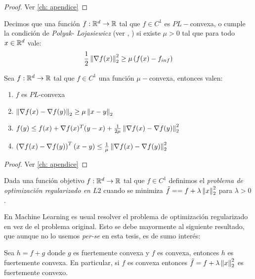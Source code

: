 \begin{proof}
	Ver \ref{ch: apendice}
\end{proof}

\begin{definition}
	\label{def: Condicion PL}
	Decimos que una funci\'on $f:{\mathbb{R}}^d \rightarrow {\mathbb{R}}$ tal que $f \in C^1$ es $PL-$convexa, o cumple la condici\'on de \textit{Polyak- Lojasiewicz} (ver \cite{polyak:1963}, \cite{lojasiewicz:1963}) si existe $\mu >0$ tal que para todo $x \in {\mathbb{R}}^d$ vale:
	\begin{equation}
	\frac{1}{2} \left\lVert\nabla f(x)\right\rVert^2_2 \geq \mu \left(f(x) - f_{inf}\right)
	\end{equation}
\end{definition}

\begin{proposition}
	\label{prop: implicancias de convexidad fuerte}
	Sea $f:{\mathbb{R}}^d \rightarrow {\mathbb{R}}$ tal que $f \in C^1$ una funci\'on $\mu-$convexa, entonces valen:
	\begin{enumerate}
		\item $f$ es $PL$-convexa
		\item $\left\lVert\nabla f(x) - \nabla f(y)\right\rVert_2 \geq \mu \left\lVert x-y\right\rVert_2$
		\item $f(y) \leq f(x) + \nabla f(x)^T (y-x) + \frac{1}{2 \mu} \left\lVert\nabla f(x) - \nabla f(y)\right\rVert_2^2$
		\item $ \left(\nabla f(x) - \nabla f(y)\right)^T (x-y) \leq \frac{1}{\mu} \left\lVert\nabla f(x) - \nabla f(y)\right\rVert_2^2$
	\end{enumerate}
\end{proposition}

\begin{proof}
	Ver \ref{ch: apendice}
\end{proof}

\begin{definition}
	Dada una funci\'on objetivo $f:{\mathbb{R}}^d \rightarrow {\mathbb{R}}$ tal que $f \in C^1$ definimos el \textit{problema de optimizaci\'on regularizado en $L2$} cuando se minimiza $\tilde{f} = = f + \lambda \left\lVert x\right\rVert_2^2$ para $\lambda >0$.
\end{definition}

En Machine Learning es usual resolver el problema de optimizaci\'on regularizado en vez de el problema original. Esto se debe mayormente al siguiente resultado, que aunque no lo usemos \textit{per-se} en esta tesis, es de sumo inter\'es:

\begin{corollary}
	\label{coro: convexa y fuertemente convexa es fuertemente convexa}
	Sea $h = f+g$ donde $g$ es fuertemente convexa y $f$ es convexa, entonces $h$ es fuertemente convexa. En particular, si $f$ es convexa entonces $\tilde{f} = f + \lambda \left\lVert x\right\rVert_2^2$ es fuertemente convexo.
\end{corollary}

